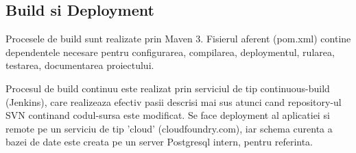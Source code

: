 \subsection{Build si Deployment}
Procesele de build sunt realizate prin Maven 3. Fisierul aferent (pom.xml)
contine dependentele necesare pentru configurarea, compilarea,
deploymentul, rularea, testarea, documentarea proiectului.

Procesul de build continuu este realizat prin serviciul de tip continuous-build
(Jenkins), 
care realizeaza efectiv pasii descrisi mai sus atunci cand repository-ul SVN continand codul-sursa este modificat. 
Se face deployment al aplicatiei si remote pe un
serviciu de tip 'cloud' (cloudfoundry.com), iar schema curenta a bazei de date
este creata pe un server Postgresql intern, pentru referinta.
